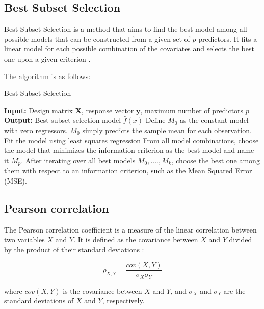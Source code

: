 \documentclass[12 pt]{scrartcl}
\numberwithin{equation}{section}
\begin{document}
\subsection{Best Subset Selection}
\label{subsec:Best Subset Selection}

Best Subset Selection is a method that aims to find the best model among all possible models that can be constructed from a given set of $p$ predictors. 
It fits a linear model for each possible combination of the covariates
and selects the best one upon a given criterion \cite[p.255]{stat-learning}.

The algorithm is as follows:

\begin{algorithm}[H]
    \caption{Best Subset Selection}\label{alg:cap}
    \begin{algorithmic}
    \State \textbf{Input:} Design matrix $\mathbf{X}$, response vector $\mathbf{y}$, maximum number of predictors $p$
    \State \textbf{Output:} Best subset selection model $\hat{f}(x)$
    \State Define $M_{0}$ as the constant model with zero regressors. $M_{0}$ simply predicts the sample mean for each observation.
    \State Fit the model using least squares regression
    \State From all model combinations, choose the model that minimizes the information criterion as the best model and name it $M_{p}$.
    \EndFor
    \EndFor
    \State After iterating over all best models $M_{0}, ...., M_{k}$, choose the best one among them with respect to an information criterion, such as the Mean Squared Error (MSE).
    \end{algorithmic}
    \end{algorithm}


\subsection{Pearson correlation}
\label{subsec:Pearson correlation}

The Pearson correlation coefficient is a measure of the linear correlation between two variables $X$ and $Y$.
It is defined as the covariance between $X$ and $Y$ divided by the product of their standard deviations \cite[p. 105]{regression}:

\begin{equation}
    \rho_{X,Y} = \frac{cov(X,Y)}{\sigma_{X} \sigma_{Y}}
\end{equation}

where $cov(X,Y)$ is the covariance between $X$ and $Y$, and $\sigma_{X}$ and $\sigma_{Y}$ are the standard deviations of $X$ and $Y$, respectively.
\end{document}
